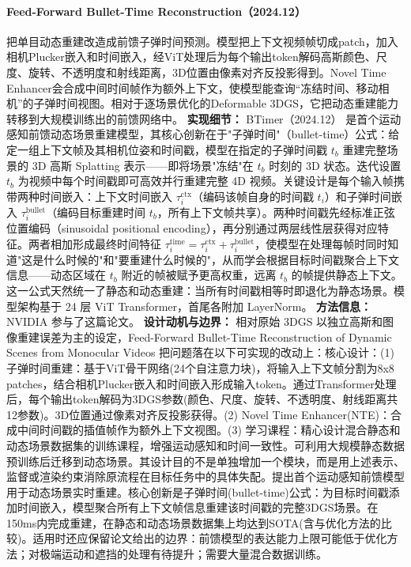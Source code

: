 \paragraph{Feed-Forward Bullet-Time Reconstruction（2024.12）\cite{2412_03526}}
把单目动态重建改造成前馈子弹时间预测。模型把上下文视频帧切成patch，加入相机Plucker嵌入和时间嵌入，经ViT处理后为每个输出token解码高斯颜色、尺度、旋转、不透明度和射线距离，3D位置由像素对齐反投影得到。Novel Time Enhancer会合成中间时间帧作为额外上下文，使模型能查询“冻结时间、移动相机”的子弹时间视图。相对于逐场景优化的Deformable 3DGS，它把动态重建能力转移到大规模训练出的前馈网络中。
\textbf{实现细节：} BTimer（2024.12） 是首个运动感知前馈动态场景重建模型，其核心创新在于"子弹时间"（bullet-time）公式：给定一组上下文帧及其相机位姿和时间戳，模型在指定的子弹时间戳 $t_b$ 重建完整场景的 3D 高斯 Splatting 表示——即将场景"冻结"在 $t_b$ 时刻的 3D 状态。迭代设置 $t_b$ 为视频中每个时间戳即可高效并行重建完整 4D 视频。关键设计是每个输入帧携带两种时间嵌入：上下文时间嵌入 $\tau_i^{\mathrm{ctx}}$（编码该帧自身的时间戳 $t_i$）和子弹时间嵌入 $\tau_i^{\mathrm{bullet}}$（编码目标重建时间 $t_b$，所有上下文帧共享）。两种时间戳先经标准正弦位置编码（sinusoidal positional encoding），再分别通过两层线性层获得对应特征。两者相加形成最终时间特征 $\tau_i^{\mathrm{time}} = \tau_i^{\mathrm{ctx}} + \tau_i^{\mathrm{bullet}}$，使模型在处理每帧时同时知道"这是什么时候的"和"要重建什么时候的"，从而学会根据目标时间戳聚合上下文信息——动态区域在 $t_b$ 附近的帧被赋予更高权重，远离 $t_b$ 的帧提供静态上下文。这一公式天然统一了静态和动态重建：当所有时间戳相等时即退化为静态场景。模型架构基于 24 层 ViT Transformer，首尾各附加 LayerNorm。
\textbf{方法信息：} NVIDIA 参与了这篇论文。
\textbf{设计动机与边界：} 相对原始 3DGS 以独立高斯和图像重建误差为主的设定，Feed-Forward Bullet-Time Reconstruction of Dynamic Scenes from Monocular Videos 把问题落在以下可实现的改动上：核心设计：(1) 子弹时间重建：基于ViT骨干网络(24个自注意力块)，将输入上下文帧分割为8x8 patches，结合相机Plucker嵌入和时间嵌入形成输入token。通过Transformer处理后，每个输出token解码为3DGS参数(颜色、尺度、旋转、不透明度、射线距离共12参数)。3D位置通过像素对齐反投影获得。(2) Novel Time Enhancer(NTE)：合成中间时间戳的插值帧作为额外上下文视图。(3) 学习课程：精心设计混合静态和动态场景数据集的训练课程，增强运动感知和时间一致性。可利用大规模静态数据预训练后迁移到动态场景。其设计目的不是单独增加一个模块，而是用上述表示、监督或渲染约束消除原流程在目标任务中的具体失配。提出首个运动感知前馈模型用于动态场景实时重建。核心创新是子弹时间(bullet-time)公式：为目标时间戳添加时间嵌入，模型聚合所有上下文帧信息重建该时间戳的完整3DGS场景。在150ms内完成重建，在静态和动态场景数据集上均达到SOTA(含与优化方法的比较)。适用时还应保留论文给出的边界：前馈模型的表达能力上限可能低于优化方法；对极端运动和遮挡的处理有待提升；需要大量混合数据训练。
